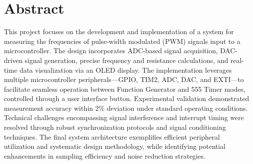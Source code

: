 \section*{Abstract}
This project focuses on the development and implementation of a system for measuring the frequencies of pulse-width modulated (PWM) signals input to a microcontroller. The design incorporates ADC-based signal acquisition, DAC-driven signal generation, precise frequency and resistance calculations, and real-time data visualization via an OLED display. The implementation leverages multiple microcontroller peripherals—GPIO, TIM2, ADC, DAC, and EXTI—to facilitate seamless operation between Function Generator and 555 Timer modes, controlled through a user interface button. Experimental validation demonstrated measurement accuracy within 2\% deviation under standard operating conditions. Technical challenges encompassing signal interference and interrupt timing were resolved through robust synchronization protocols and signal conditioning techniques. The final system architecture exemplifies efficient peripheral utilization and systematic design methodology, while identifying potential enhancements in sampling efficiency and noise reduction strategies.
